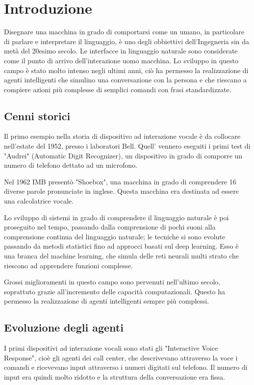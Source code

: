 \documentclass[twoside]{supsistudent}
\begin{document}
\chapter{Introduzione}

Disegnare una macchina in grado di comportarsi come un umano, in particolare di parlare e interpretare il linguaggio, è uno degli obbiettivi dell'Ingegneria sin da metà del 20esimo secolo. Le interfacce in linguaggio naturale sono considerate come il punto di arrivo dell'interazione uomo macchina.
Lo sviluppo in questo campo è stato molto intenso negli ultimi anni, ciò ha permesso la realizzazione di agenti intelligenti che simulino una conversazione con la persona e che riescano a compiere azioni più complesse di semplici comandi con frasi standardizzate.

\section{Cenni storici}

Il primo esempio nella storia di dispositivo ad interazione vocale è da collocare nell'estate del 1952, presso i laboratori Bell.
Quell' vennero eseguiti i primi test di "Audrei" (Automatic Digit Recognizer), un dispositivo in grado di comporre un numero di telefono dettato ad un microfono.

Nel 1962 IMB presentò "Shoebox", una macchina in grado di comprendere 16 diverse parole pronunciate in inglese. Questa macchina era destinata ad essere una calcolatrice vocale.

Lo sviluppo di sistemi in grado di comprendere il linguaggio naturale è poi proseguito nel tempo, passando dalla comprensione di pochi suoni alla comprensione continua del linguaggio naturale; le tecniche si sono evolute passando da metodi statistici fino ad approcci basati sul deep learning. Esso è una branca del machine learning, che simula delle reti neurali multi strato che riescono ad apprendere funzioni complesse. \cite{deeplearninggeneral}

Grossi miglioramenti in questo campo sono pervenuti nell'ultimo secolo, soprattuto grazie all'incremento delle capacità computazionali. Questo ha permesso la realizzazione di agenti intelligenti sempre più complessi.

\section{Evoluzione degli agenti}

I primi dispositivi ad interazione vocali sono stati gli "Interactive Voice Response", cioè gli agenti dei call center, che descrivevano attraverso la voce i comandi e ricevevano input attraverso i numeri digitati sul telefono. Il numero di input era quindi molto ridotto e la struttura della conversazione era fissa.
\end{document}
